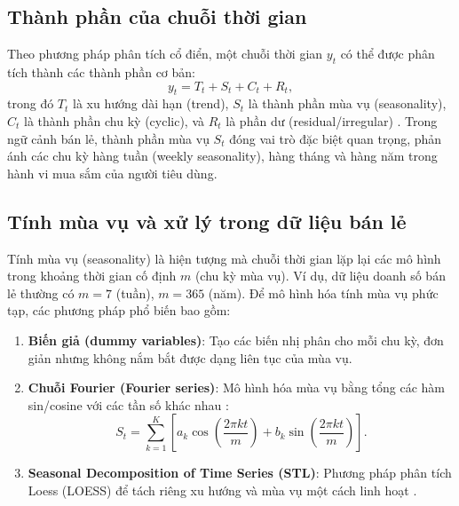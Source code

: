 \subsection{Thành phần của chuỗi thời gian}
\label{subsec:thanh_phan}

Theo phương pháp phân tích cổ điển, một chuỗi thời gian $y_t$ có thể được phân tích thành các thành phần cơ bản:
\begin{equation}
    y_t = T_t + S_t + C_t + R_t,
    \label{eq:phan_tich_chuoi}
\end{equation}
trong đó $T_t$ là xu hướng dài hạn (trend), $S_t$ là thành phần mùa vụ (seasonality), $C_t$ là thành phần chu kỳ (cyclic), và $R_t$ là phần dư (residual/irregular) \citep{hyndman2018forecasting}. Trong ngữ cảnh bán lẻ, thành phần mùa vụ $S_t$ đóng vai trò đặc biệt quan trọng, phản ánh các chu kỳ hàng tuần (weekly seasonality), hàng tháng và hàng năm trong hành vi mua sắm của người tiêu dùng.

\subsection{Tính mùa vụ và xử lý trong dữ liệu bán lẻ}
\label{subsec:mua_vu}

Tính mùa vụ (seasonality) là hiện tượng mà chuỗi thời gian lặp lại các mô hình trong khoảng thời gian cố định $m$ (chu kỳ mùa vụ). Ví dụ, dữ liệu doanh số bán lẻ thường có $m = 7$ (tuần), $m = 365$ (năm). Để mô hình hóa tính mùa vụ phức tạp, các phương pháp phổ biến bao gồm:

\begin{enumerate}
    \item \textbf{Biến giả (dummy variables)}: Tạo các biến nhị phân cho mỗi chu kỳ, đơn giản nhưng không nắm bắt được dạng liên tục của mùa vụ.
    \item \textbf{Chuỗi Fourier (Fourier series)}: Mô hình hóa mùa vụ bằng tổng các hàm sin/cosine với các tần số khác nhau \citep{taylor2018forecasting}:
    \begin{equation}
        S_t = \sum_{k=1}^{K} \left[a_k \cos\!\left(\frac{2\pi k t}{m}\right) + b_k \sin\!\left(\frac{2\pi k t}{m}\right)\right].
        \label{eq:fourier_seasonality}
    \end{equation}
    \item \textbf{Seasonal Decomposition of Time Series (STL)}: Phương pháp phân tích Loess (LOESS) để tách riêng xu hướng và mùa vụ một cách linh hoạt \citep{cleveland1990stl}.
\end{enumerate}

